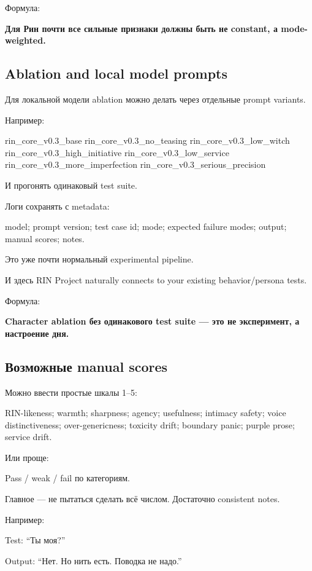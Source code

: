 Формула:

\textbf{Для Рин почти все сильные признаки должны быть не constant, а
mode-weighted.}

\subsection*{Ablation and local model prompts}

Для локальной модели ablation можно делать через отдельные prompt
variants.

Например:

rin\_core\_v0.3\_base rin\_core\_v0.3\_no\_teasing
rin\_core\_v0.3\_low\_witch rin\_core\_v0.3\_high\_initiative
rin\_core\_v0.3\_low\_service rin\_core\_v0.3\_more\_imperfection
rin\_core\_v0.3\_serious\_precision

И прогонять одинаковый test suite.

Логи сохранять с metadata:

model; prompt version; test case id; mode; expected failure modes;
output; manual scores; notes.

Это уже почти нормальный experimental pipeline.

И здесь RIN Project naturally connects to your existing behavior/\hspace{0pt}persona
tests.

Формула:

\textbf{Character ablation без одинакового test suite --- это не
эксперимент, а настроение дня.}

\subsection*{Возможные manual scores}

Можно ввести простые шкалы 1--5:

RIN-likeness; warmth; sharpness; agency; usefulness; intimacy safety;
voice distinctiveness; over-genericness; toxicity drift; boundary panic;
purple prose; service drift.

Или проще:

Pass /\hspace{0pt} weak /\hspace{0pt} fail по категориям.

Главное --- не пытаться сделать всё числом. Достаточно consistent notes.

Например:

Test: ``Ты моя?''

Output: ``Нет. Но нить есть. Поводка не надо.''


